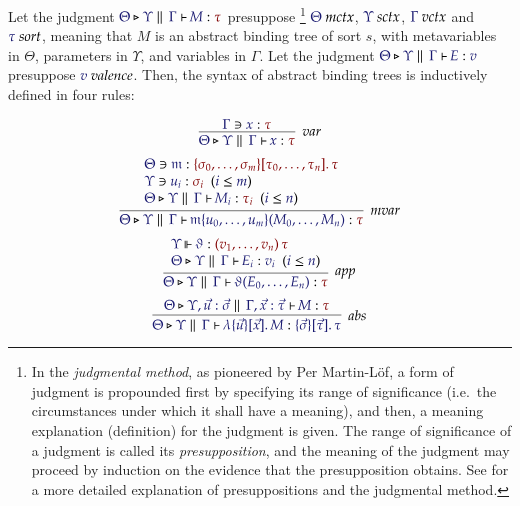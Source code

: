 \documentclass[11pt]{article}
\theoremstyle{definition}
\theoremstyle{remark}
\numberwithin{equation}{section}
\begin{document}
Let the judgment $\IsAbt{\Theta}{\Upsilon}{\Gamma}{M}{\tau}$ presuppose
\footnote{
  In the \emph{judgmental method}, as pioneered by Per Martin-L\"of, a form of
  judgment is propounded first by specifying its range of significance (i.e.\
  the circumstances under which it shall have a meaning), and then, a meaning
  explanation (definition) for the judgment is given. The range of significance
  of a judgment is called its \emph{presupposition}, and the meaning of the
  judgment may proceed by induction on the evidence that the presupposition
  obtains. See \cite{schroeder-heister:1987} for a more detailed explanation of
  presuppositions and the judgmental method.
}
$\IsMetaCtx{\Theta}$, $\IsSymCtx\Upsilon$, $\IsVarCtx\Gamma$ and
$\IsSort{\tau}$, meaning that $M$ is an abstract binding tree of sort $s$, with
metavariables in $\Theta$, parameters in $\Upsilon$, and variables in $\Gamma$.
Let the judgment $\IsBTm{\Theta}{\Upsilon}{\Gamma}{E}{v}$ presuppose
$\IsValence{v}$. Then, the syntax of abstract binding trees is inductively
defined in four rules:

\[
  \infer[\textit{var}]{
    \IsAbt{\Theta}{\Upsilon}{\Gamma}{x}{\tau}
  }{
    \Lookup{\Gamma}{x}{\tau}
  }
\]
\[
  \infer[\textit{mvar}]{
    \IsAbt{\Theta}{\Upsilon}{\Gamma}{
      \MApp{\MV{m}}{u_0,\dots,u_m}{M_0,\dots,M_n}
    }{\tau}
  }{
    \begin{array}{l}
      \Lookup{\Theta}{\MV{m}}{
        \MkValence{
          \sigma_0,\dots,\sigma_m
        }{
          \tau_0,\dots,\tau_n
        }{\tau}
      }
\\
      \HypJ{
        \Lookup{\Upsilon}{u_i}{\sigma_i}
      }{\Leq{i}{m}}
\\
      \HypJ{
        \IsAbt{\Theta}{\Upsilon}{\Gamma}{M_i}{\tau_i}
      }{\Leq{i}{n}}
    \end{array}
  }
\]
\[
  \infer[\textit{app}]{
    \IsAbt{\Theta}{\Upsilon}{\Gamma}{
      \App{\vartheta}{E_0,\dots,E_n}
    }{\tau}
  }{
    \begin{array}{l}
      \IsOperator{\Upsilon}{\vartheta}{
        \MkArity{v_1,\dots,v_n}{\tau}
      }
\\
      \HypJ{
        \IsBTm{\Theta}{\Upsilon}{\Gamma}{E_i}{v_i}
      }{\Leq{i}{n}}
    \end{array}
  }
\]
\[
  \infer[\textit{abs}]{
    \IsBTm{\Theta}{\Upsilon}{\Gamma}{
      \MkBTm{\vec{u}}{\vec{x}}{M}
    }{
      \MkValence{\vec{\sigma}}{\vec{\tau}}{\tau}
    }
  }{
    \IsAbt{
      \Theta
    }{
      \Upsilon, \vec{u}:\vec{\sigma}
    }{
      \Gamma,\vec{x}:{\vec{\tau}}
    }{
      M
    }{\tau}
  }
\]
\end{document}
